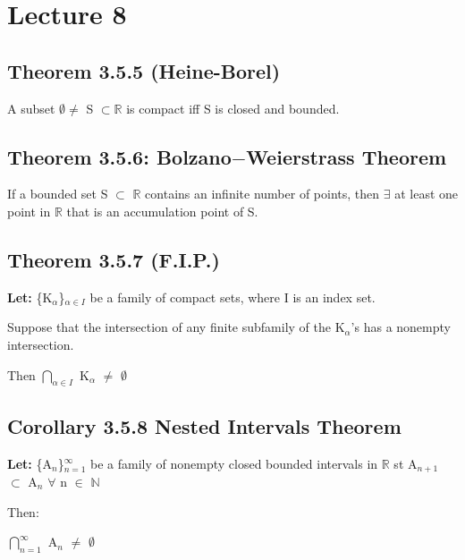 \documentclass{article}
\newcommand{\mt}[1]{\ensuremath{#1}}
\newcommand\bsc[2][\DefaultOpt]{%
  \def\DefaultOpt{#2}%
  \section[#1]{#2}%
}
\newcommand\ssc[2][\DefaultOpt]{%
  \def\DefaultOpt{#2}%
  \subsection[#1]{#2}%
}
\newcommand{\lt}[1]{\textbf{Let: } #1}
\newcommand{\br}{\mt{\mathbb{R}} }       %
\newcommand{\bn}{\mt{\mathbb{N}} }       %
\newcommand{\fa}{\mt{\forall} }          %
\newcommand{\afa}{\mt{\alpha} }
\newcommand{\mem}{\mt{\in} }
\newcommand{\exs}{\mt{\exists} }
\newcommand{\es}{\mt{\emptyset} }        %
\newcommand{\sbs}{\mt{\subset} }         %
\newcommand{\uw}[2]{#1\mt{_{#2}}}
\newcommand{\nrng}[2]{\mt{\bigcap_{#1}^{#2}}}
\begin{document}
\newpage

\bsc{Lecture 8}{

\ssc{Theorem 3.5.5 (Heine-Borel)}{

A subset $\es \neq$ S $\sbs \br$ is compact iff S is closed and bounded.
}

\ssc{Theorem 3.5.6: Bolzano$-$Weierstrass Theorem}{

If a bounded set S \sbs \br contains an infinite number of points, then \exs at least one point in \br that is an accumulation point of S.
}

}

\ssc{Theorem 3.5.7 (F.I.P.)}{

\lt{\uw{\{\uw{K}{\afa}\}}{\afa \mem I} be a family of compact sets, where I is an index set.}

Suppose that the intersection of any finite subfamily of the \uw{K}{\afa}'s has a nonempty intersection.

Then \nrng{\afa \mem I}{} \uw{K}{\afa} $\neq$ \es
}

\ssc{Corollary 3.5.8 Nested Intervals Theorem}{

\lt{\{\uw{A}{n}\}$^\infty_{n = 1}$ be a family of nonempty closed bounded intervals in \br st A$_{n + 1}$ \sbs A$_n$ \fa n \mem \bn}

Then:

\nrng{n = 1}{\infty} \uw{A}{n} $\neq$ \es
}

\newpage
\end{document}
